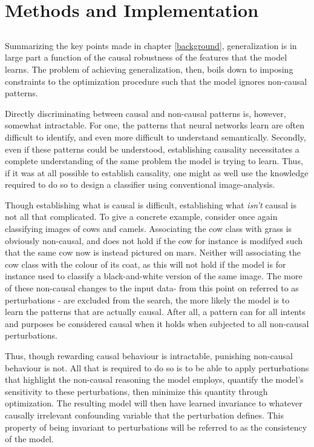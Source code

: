 \chapter{Methods and Implementation}
\setcounter{chapter}{3}
\section{\alg}

Summarizing the key points made in chapter \ref{background}, generalization is in large part a function of the causal robustness of the features that the model learns. The problem of achieving generalization, then, boils down to imposing constraints to the optimization procedure such that the model ignores non-causal patterns.

Directly discriminating between causal and non-causal patterns is, however, somewhat intractable. For one, the patterns that neural networks learn are often difficult to identify, and even more difficult to understand semantically. Secondly, even if these patterns could be understood, establishing causality necessitates a complete understanding of the same problem the model is trying to learn. Thus, if it was at all possible to establish causality, one might as well use the knowledge required to do so to design a classifier using conventional image-analysis. 

Though establishing what is causal is difficult, establishing what \textit{isn't} causal is not all that complicated. To give a concrete example, consider once again classifying images of cows and camels. Associating the cow class with grass is obviously non-causal, and does not hold if the cow for instance is modifyed such that the same cow now is instead pictured on mars. Neither will associating the cow class with the colour of its coat, as this will not hold if the model is for instance used to classify a black-and-white version of the same image. The more of these non-causal changes to the input data- from this point on referred to as perturbations - are excluded from the search, the more likely the model is to learn the patterns that are actually causal. After all, a pattern can for all intents and purposes be considered causal when it holds when subjected to all non-causal perturbations. 

Thus, though rewarding causal behaviour is intractable, punishing non-causal behaviour is not. All that is required to do so is to be able to apply perturbations that highlight the non-causal reasoning the model employs, quantify the model's sensitivity to these perturbations, then minimize this quantity through optimization. The resulting model will then have learned invariance to whatever causally irrelevant confounding variable that the perturbation defines. This property of being invariant to perturbations will be referred to as the consistency of the model. 

